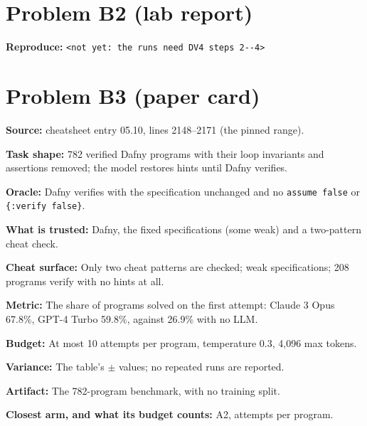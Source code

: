 \documentclass[11pt]{article}
\begin{document}
\section*{Problem B2 (lab report)}\label{ans:B2}
\begin{answer}
\textbf{Reproduce:} \verb+<not yet: the runs need DV4 steps 2--4>+
\end{answer}

\section*{Problem B3 (paper card)}\label{ans:B3}
\begin{answer}
\textbf{Source:} cheatsheet entry 05.10, lines 2148--2171 (the pinned range).

\textbf{Task shape:} 782 verified Dafny programs with their loop invariants and
assertions removed; the model restores hints until Dafny verifies.

\textbf{Oracle:} Dafny verifies with the specification unchanged and no \texttt{assume
false} or \texttt{\{:verify false\}}.

\textbf{What is trusted:} Dafny, the fixed specifications (some weak) and a
two-pattern cheat check.

\textbf{Cheat surface:} Only two cheat patterns are checked; weak specifications; 208
programs verify with no hints at all.

\textbf{Metric:} The share of programs solved on the first attempt: Claude 3 Opus
67.8\%, GPT-4 Turbo 59.8\%, against 26.9\% with no LLM.

\textbf{Budget:} At most 10 attempts per program, temperature 0.3, 4,096 max tokens.

\textbf{Variance:} The table's $\pm$ values; no repeated runs are reported.

\textbf{Artifact:} The 782-program benchmark, with no training split.

\textbf{Closest arm, and what its budget counts:} A2, attempts per program.
\end{answer}

\end{document}
